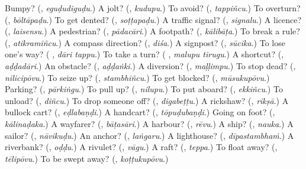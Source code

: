 \begin{tcolorbox}[breakable,colback=teal!4,colframe=teal!35!black,title={Before you move on}]
Bumpy? (\textbf{}, \emph{eguḍudiguḍu}.) A jolt? (\textbf{}, \emph{kudupu}.) To avoid? (\textbf{}, \emph{tappiñcu}.) To overturn? (\textbf{}, \emph{bōltāpaḍu}.) To get dented? (\textbf{}, \emph{soṭṭapaḍu}.) A traffic signal? (\textbf{}, \emph{signalu}.) A licence? (\textbf{}, \emph{laisensu}.) A pedestrian? (\textbf{}, \emph{pādacāri}.) A footpath? (\textbf{}, \emph{kālibāṭa}.) To break a rule? (\textbf{}, \emph{atikramiñcu}.) A compass direction? (\textbf{}, \emph{diśa}.) A signpost? (\textbf{}, \emph{sūcika}.) To lose one's way? (\textbf{ }, \emph{dāri tappu}.) To take a turn? (\textbf{ }, \emph{malupu tirugu}.) A shortcut? (\textbf{}, \emph{aḍḍadāri}.) An obstacle? (\textbf{}, \emph{aḍḍaṅki}.) A diversion? (\textbf{}, \emph{maḷḷimpu}.) To stop dead? (\textbf{}, \emph{nilicipōvu}.) To seize up? (\textbf{}, \emph{stambhiñcu}.) To get blocked? (\textbf{}, \emph{mūsukupōvu}.) Parking? (\textbf{}, \emph{pārkiṅgu}.) To pull up? (\textbf{}, \emph{nilupu}.) To put aboard? (\textbf{}, \emph{ekkiñcu}.) To unload? (\textbf{}, \emph{diñcu}.) To drop someone off? (\textbf{}, \emph{digabeṭṭu}.) A rickshaw? (\textbf{}, \emph{rikṣā}.) A bullock cart? (\textbf{}, \emph{eḍlabaṇḍi}.) A handcart? (\textbf{}, \emph{tōpuḍubaṇḍi}.) Going on foot? (\textbf{}, \emph{kālinaḍaka}.) A wayfarer? (\textbf{}, \emph{bāṭasāri}.) A harbour? (\textbf{}, \emph{rēvu}.) A ship? (\textbf{}, \emph{nauka}.) A sailor? (\textbf{}, \emph{nāvikuḍu}.) An anchor? (\textbf{}, \emph{laṅgaru}.) A lighthouse? (\textbf{}, \emph{dīpastambhaṁ}.) A riverbank? (\textbf{}, \emph{oḍḍu}.) A rivulet? (\textbf{}, \emph{vāgu}.) A raft? (\textbf{}, \emph{teppa}.) To float away? (\textbf{}, \emph{tēlipōvu}.) To be swept away? (\textbf{}, \emph{koṭṭukupōvu}.)
\end{tcolorbox}
